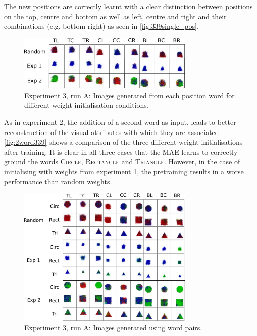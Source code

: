 The new positions are correctly learnt with a clear distinction between positions on the top, centre and bottom as well as left, centre and right and their combinations (e.g. bottom right) as seen in \autoref{fig:339single_pos}.

\begin{figure}[h]
\centering
\includegraphics[width=0.75\textwidth]{Figs/shapes/singlelabel339_pos.png}
\caption{Experiment 3, run A: Images generated from each position word for different weight initialisation conditions.}
\label{fig:339single_pos}
\end{figure}


As in experiment 2, the addition of a second word as input, leads to better reconstruction of the visual attributes with which they are associated. \autoref{fig:2word339} shows a comparison of the three different weight initialisations after training. It is clear in all three cases that the \ac{MAE} learns to correctly ground the words \textsc{Circle}, \textsc{Rectangle} and \textsc{Triangle}. However, in the case of initialising with weights from experiment 1, the pretraining results in a worse performance than random weights.
\begin{figure}[h]
\centering
\includegraphics[width=0.75\textwidth]{Figs/shapes/2word339_pos.png}
\caption{Experiment 3, run A: Images generated using word pairs.}
\label{fig:2word339}
\end{figure}


